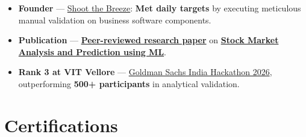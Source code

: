 \documentclass[a4paper,11pt]{article}
\newcommand{\ulink}[2]{\href{#1}{#2}}
\begin{document}
\begin{itemize}[nosep, leftmargin=1.5em, itemsep=2pt, topsep=2pt]
  \item {\color[HTML]{0A0A0A}\fontsize{11}{14}\selectfont \textbf{Founder} --- \ulink{https://shoot-the-breeze.vercel.app}{Shoot the Breeze}: \textbf{Met daily targets} by executing meticulous manual validation on business software components.}
  \item {\color[HTML]{0A0A0A}\fontsize{11}{14}\selectfont \textbf{Publication} --- \ulink{https://www.elruha.org/_files/ugd/614b1f_6b95e1b697bf452b9907ba46e0151c05.pdf\#page=774}{\textbf{Peer-reviewed research paper}} on \ulink{https://github.com/su-jin1425/Set-Project}{\textbf{Stock Market Analysis and Prediction using ML}}.}
  \item {\color[HTML]{0A0A0A}\fontsize{11}{14}\selectfont \textbf{Rank 3 at VIT Vellore} --- \ulink{https://www.hackerrank.com/contests/goldman-sachs-india-hackathon-2026-cs/leaderboard}{Goldman Sachs India Hackathon 2026}, outperforming \textbf{500+ participants} in analytical validation.}
\end{itemize}

\section{Certifications}
\vspace{2pt}
\end{document}
